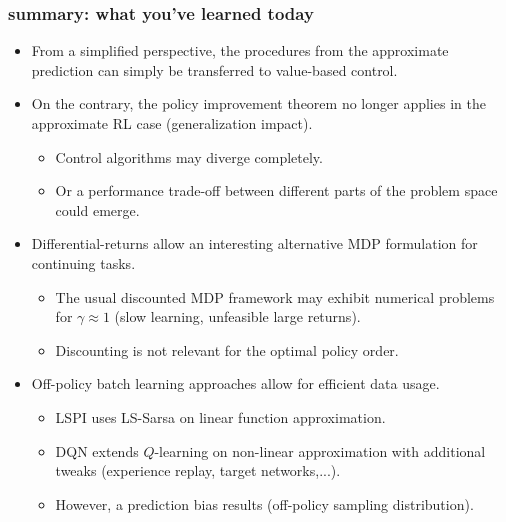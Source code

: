 \begin{frame}
\frametitle{summary: what you've learned today}
\begin{itemize}
	\item From a simplified perspective, the procedures from the approximate prediction can simply be transferred to value-based control.\pause
	\item On the contrary, the policy improvement theorem no longer applies in the approximate RL case (generalization impact).\pause
	\begin{itemize}
		\item Control algorithms may diverge completely.\pause
		\item Or a performance trade-off between different parts of the problem space could emerge.\pause
	\end{itemize}
	\item Differential-returns allow an interesting alternative MDP formulation for continuing tasks.
		\begin{itemize}
		\item The usual discounted MDP framework may exhibit numerical problems for $\gamma\approx 1$ (slow learning, unfeasible large returns).\pause
		\item Discounting is not relevant for the optimal policy order.\pause
	\end{itemize}
	\item Off-policy batch learning approaches allow for efficient data usage.
	\begin{itemize}
		\item LSPI uses LS-Sarsa on linear function approximation.\pause
		\item DQN extends $Q$-learning on non-linear approximation with additional tweaks (experience replay, target networks,...).\pause
		\item However, a prediction bias results (off-policy sampling distribution).  
	\end{itemize}
\end{itemize}
\end{frame}